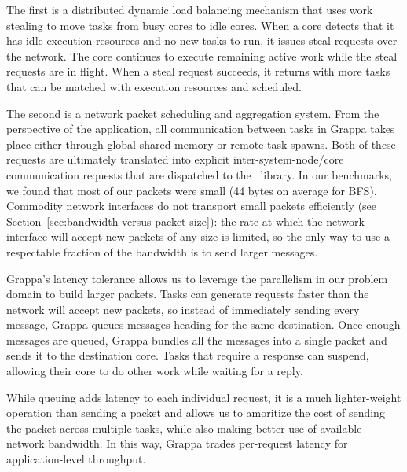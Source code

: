 The first is a distributed dynamic load balancing mechanism that uses work stealing to
move tasks from busy cores to idle cores. When a core detects that it
has idle execution resources and no new tasks to run, it issues steal
requests over the network. The core continues to execute remaining
active work while the steal requests are in flight. When a steal
request succeeds, it returns with more tasks that can be matched with
execution resources and scheduled.

The second is a network packet scheduling and aggregation system. From
the perspective of the application, all communication between tasks in
Grappa takes place either through global shared memory or remote task
spawns. Both of these requests are ultimately translated into explicit
inter-system-node/core communication requests that are dispatched to
the \gasnet~library. In our benchmarks, we found that most of our
packets were small (44 bytes on average for BFS). Commodity network
interfaces do not transport small packets efficiently (see
Section~\ref{sec:bandwidth-versus-packet-size}): the rate at which the
network interface will accept new packets of any size is limited, so
the only way to use a respectable fraction of the bandwidth is to send
larger messages. 

Grappa's latency tolerance allows us to leverage the parallelism in
our problem domain to build larger packets. Tasks can generate
requests faster than the network will accept new packets, so instead
of immediately sending every message, Grappa queues messages heading
for the same destination. Once enough messages are queued, Grappa
bundles all the messages into a single packet and sends it to the
destination core. Tasks that require a response can suspend, allowing
their core to do other work while waiting for a reply. 

While queuing adds latency to each individual request, it is a much
lighter-weight operation than sending a packet and allows us to
amoritize the cost of sending the packet across multiple tasks, while
also making better use of available network bandwidth. In this way,
Grappa trades per-request latency for application-level
throughput.
